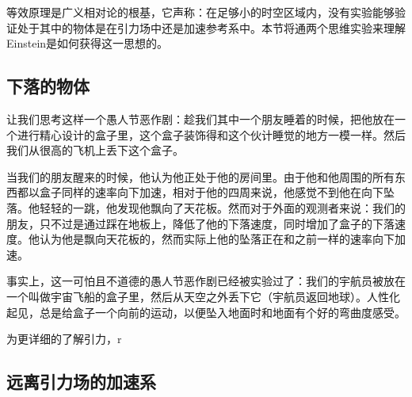 
等效原理是广义相对论的根基，它声称：在足够小的时空区域内，没有实验能够验证处于其中的物体是在引力场中还是加速参考系中。本节将通两个思维实验来理解Einstein是如何获得这一思想的。

\subsection{下落的物体}
让我们思考这样一个愚人节恶作剧：趁我们其中一个朋友睡着的时候，把他放在一个进行精心设计的盒子里，这个盒子装饰得和这个伙计睡觉的地方一模一样。然后我们从很高的飞机上丢下这个盒子。

当我们的朋友醒来的时候，他认为他正处于他的房间里。由于他和他周围的所有东西都以盒子同样的速率向下加速，相对于他的四周来说，他感觉不到他在向下坠落。他轻轻的一跳，他发现他飘向了天花板。然而对于外面的观测者来说：我们的朋友，只不过是通过踩在地板上，降低了他的下落速度，同时增加了盒子的下落速度。他认为他是飘向天花板的，然而实际上他的坠落正在和之前一样的速率向下加速。

事实上，这一可怕且不道德的愚人节恶作剧已经被实验过了：我们的宇航员被放在一个叫做宇宙飞船的盒子里，然后从天空之外丢下它（宇航员返回地球）。人性化起见，总是给盒子一个向前的运动，以便坠入地面时和地面有个好的弯曲度感受。

为更详细的了解引力，r




\subsection{远离引力场的加速系}







